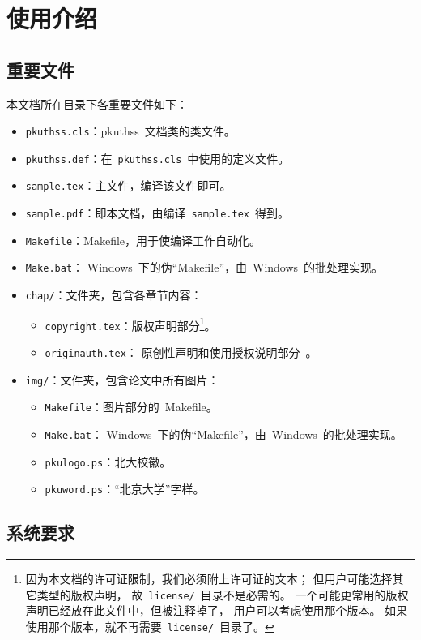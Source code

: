 \chapter{使用介绍}
	\section{重要文件}

	本文档所在目录下各重要文件如下：
	\begin{itemize}\denselist
		\item \verb|pkuthss.cls|：pkuthss~文档类的类文件。
		\item \verb|pkuthss.def|：在~\verb|pkuthss.cls|~中使用的定义文件。
		\item \verb|sample.tex|：主文件，编译该文件即可。
		\item \verb|sample.pdf|：即本文档，由编译~\verb|sample.tex|~得到。
		\item \verb|Makefile|：Makefile，用于使编译工作自动化。
		\item \verb|Make.bat|：
			Windows~下的伪“Makefile”，由~Windows~的批处理实现。
		\item \verb|chap/|：文件夹，包含各章节内容：
		\begin{itemize}\denselist
			\item \verb|copyright.tex|：版权声明部分\footnote%
			{%
				因为本文档的许可证限制，我们必须附上许可证的文本；
				但用户可能选择其它类型的版权声明，
				故~\texttt{license/}\linebreak[1]~目录不是必需的。
				一个可能更常用的版权声明已经放在此文件中，但被注释掉了，
				用户可以考虑使用那个版本。
				如果使用那个版本，就不再需要~\texttt{license/}~目录了。
			}。
			\item \verb|originauth.tex|：
				原创性声明和使用授权说明部分~\supercite{F11}。
		\end{itemize}
		\item \verb|img/|：文件夹，包含论文中所有图片：
		\begin{itemize}\denselist
			\item \verb|Makefile|：图片部分的~Makefile。
			\item \verb|Make.bat|：
				Windows~下的伪“Makefile”，由~Windows~的批处理实现。
			\item \verb|pkulogo.ps|：北大校徽。
			\item \verb|pkuword.ps|：“北京大学”字样。
		\end{itemize}
	\end{itemize}

	\section{系统要求}

